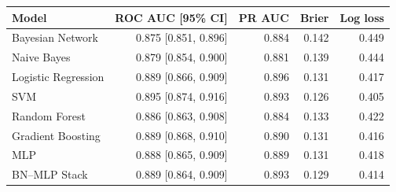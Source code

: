 \begin{tabular}{lrrrr}
\toprule
Model & ROC AUC [95\% CI] & PR AUC & Brier & Log loss \\
\midrule
Bayesian Network & 0.875 [0.851, 0.896] & 0.884 & 0.142 & 0.449 \\
Naive Bayes & 0.879 [0.854, 0.900] & 0.881 & 0.139 & 0.444 \\
Logistic Regression & 0.889 [0.866, 0.909] & 0.896 & 0.131 & 0.417 \\
SVM & 0.895 [0.874, 0.916] & 0.893 & 0.126 & 0.405 \\
Random Forest & 0.886 [0.863, 0.908] & 0.884 & 0.133 & 0.422 \\
Gradient Boosting & 0.889 [0.868, 0.910] & 0.890 & 0.131 & 0.416 \\
MLP & 0.888 [0.865, 0.909] & 0.889 & 0.131 & 0.418 \\
BN--MLP Stack & 0.889 [0.864, 0.909] & 0.893 & 0.129 & 0.414 \\
\bottomrule
\end{tabular}
